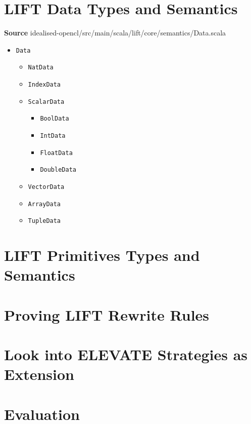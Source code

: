 \documentclass[]{article}
\begin{document}
\section{LIFT Data Types and Semantics}
\textbf{Source} \;idealised-opencl/src/main/scala/lift/core/semantics/Data.scala
\begin{itemize}
    \item \texttt{Data}
    \begin{itemize}
        \item \texttt{NatData}
        \item \texttt{IndexData}
        \item \texttt{ScalarData}
        \begin{itemize}
            \item \texttt{BoolData}
            \item \texttt{IntData}
            \item \texttt{FloatData}
            \item \texttt{DoubleData}
        \end{itemize}
        \item \texttt{VectorData}
        \item \texttt{ArrayData}
        \item \texttt{TupleData}
    \end{itemize}
\end{itemize}

\section{LIFT Primitives Types and Semantics}

\section{Proving LIFT Rewrite Rules}

\section{Look into ELEVATE Strategies as Extension}

\section{Evaluation}

\end{document}
